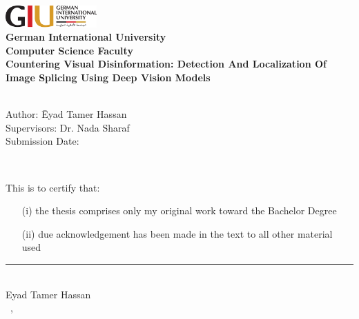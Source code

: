 \newcommand{\titlePage}{

\thispagestyle{empty}
\begin{center}
	\includegraphics[width=3.5cm]{figures/image.png}\\[2mm]
	\textbf{German International University}\\[2mm]
		\textbf{Computer Science Faculty}\\[1mm]

	
	\vspace{2cm}
	\doublespacing
	{\Huge \textbf{Countering Visual Disinformation: Detection And Localization Of Image Splicing Using Deep Vision Models}}\\
	\singlespacing
	\vspace{2cm}
	{\large \textbf{\typeOfThesis}}\\
	
	\vfill
	\parbox{1cm}{
  		\begin{large}
    			\begin{tabbing}
       			Author: \hspace{2cm}  
        			\= Eyad Tamer Hassan \\[2mm]
      			Supervisors: 
        			\> Dr. Nada Sharaf\\[2mm]
      			Submission Date: 
        			\>\submissionDate\\
    			\end{tabbing}
  		\end{large}
	}\\
\end{center}
\clearpage
}
\titlePage 
\thispagestyle{empty}
This is to certify that:
\begin{itemize}
\item[(i)] the thesis comprises only my original work toward the Bachelor Degree
\item[(ii)] due acknowledgement has been made in the text to all other material used
\end{itemize}

\vspace{2cm}
\begin{flushright}
\rule[0mm]{6cm}{0.2mm}\\
Eyad Tamer Hassan\\ 
\submissionDay~\submissionMonth,~\submissionYear\\
\end{flushright}
\clearpage
